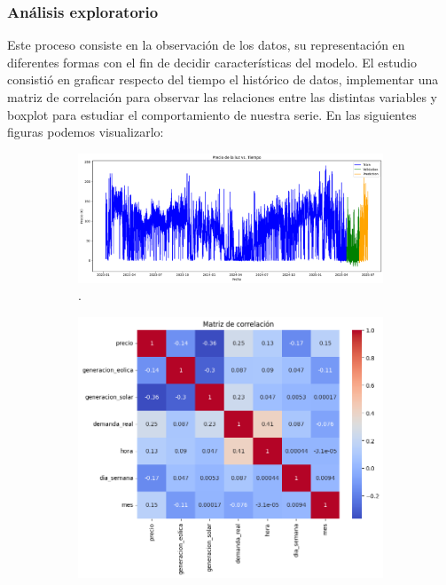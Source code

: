 \subsubsection{Análisis exploratorio}
%
%
%
Este proceso consiste en la observación de los datos, su representación en diferentes formas con el fin de decidir características del modelo. El estudio consistió en graficar respecto del tiempo el histórico de datos, implementar una matriz de correlación para observar las relaciones entre las distintas variables y boxplot para estudiar el comportamiento de nuestra serie. En las siguientes figuras podemos visualizarlo:
\begin{figure}[H]
\centering
\begin{subfigure}[b]{0.35\textwidth}
\centering
\includegraphics[width=\textwidth]{figuras/historico_precios.png}
\caption[Precio de la luz respecto del tiempo]{.}
\label{Precio vs tiempo}
\end{subfigure}
\begin{subfigure}[b]{0.35\textwidth}
\centering
\includegraphics[width=\textwidth]{figuras/matriz_correlacion.png}

\end{subfigure}
\end{figure}
